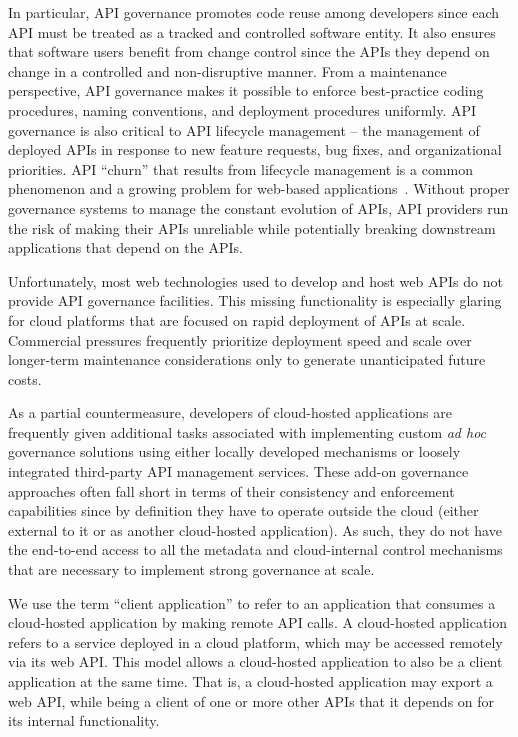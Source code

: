 In particular, API governance promotes code reuse among developers
since each API must be treated as a tracked and controlled software entity.
It also ensures that software users benefit from change control since the APIs
they depend on
change in a controlled and non-disruptive manner.  From a maintenance
perspective, API governance 
makes it possible to enforce best-practice coding procedures, 
naming conventions, and deployment procedures uniformly.
API governance is also critical to API lifecycle
management --  the management of deployed APIs in response to new feature
requests, bug fixes, and organizational priorities. 
API ``churn'' that results from lifecycle management
is a common phenomenon and a growing
problem for web-based applications~\cite{6930607}.
Without proper governance systems to manage the constant evolution of APIs,
API providers run the risk of making their APIs unreliable while potentially
breaking downstream applications that depend on the APIs.

Unfortunately, most web technologies used to develop and host web APIs do not 
provide API governance facilities. This missing functionality is
especially glaring
for cloud platforms that are focused on rapid
deployment of APIs at scale.   Commercial pressures frequently prioritize
deployment speed and scale over longer-term maintenance considerations only to
generate unanticipated future costs.

As a partial countermeasure, developers of cloud-hosted applications are 
frequently given additional tasks associated with 
implementing custom {\em ad hoc} governance solutions using either locally
developed mechanisms or loosely integrated
third-party API management services. 
These add-on governance
approaches often fall short in terms of their consistency and enforcement
capabilities since
by definition they have to operate outside the
cloud (either external to it or as another cloud-hosted application). 
As such, they do not have the end-to-end 
access to all the metadata and cloud-internal control mechanisms
that are necessary to implement strong governance at scale. 

We use the term ``client application'' to refer to an application that consumes
a cloud-hosted application by making remote API calls. A cloud-hosted
application refers to a service deployed in a cloud platform, which may
be accessed remotely via its web API. This model allows a cloud-hosted
application to also be a client application at the same time. That is, a cloud-hosted
application may export a web API, while being a client of one or more
other APIs that it depends on for its internal functionality. 